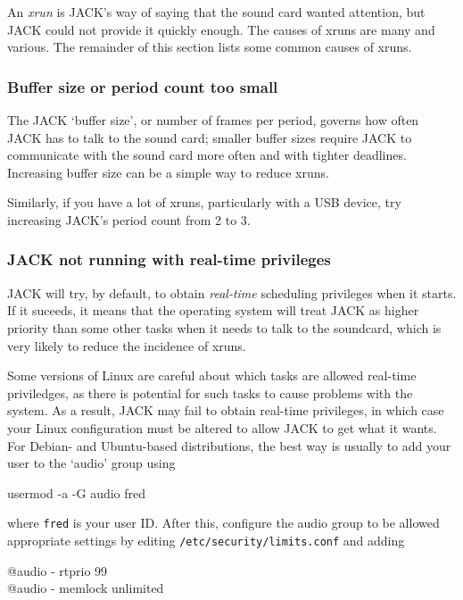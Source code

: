 \documentclass[10pt,a4paper]{book}
\begin{document}
{An \emph{xrun}  is JACK's way of saying that the sound
card wanted attention, but JACK could not provide it quickly enough.
The causes of xruns are many and various.  The remainder of this
section lists some common causes of xruns.


\subsubsection{Buffer size or period count too small}

The JACK `buffer size', or number of frames per period, governs how
often JACK has to talk to the sound card; smaller buffer sizes require
JACK to communicate with the sound card more often and with tighter
deadlines.  Increasing buffer size can be a simple way to reduce
xruns.

Similarly, if you have a lot of xruns, particularly with a USB device,
try increasing JACK's period count from 2 to 3.


\subsubsection{JACK not running with real-time privileges}

JACK will try, by default, to obtain \emph{real-time} scheduling
privileges when it starts.  If it suceeds, it means that the
operating system will treat JACK as higher priority than some other
tasks when it needs to talk to the soundcard, which is very likely to
reduce the incidence of xruns.

Some versions of Linux are careful about which tasks are allowed
real-time priviledges, as there is potential for such tasks to cause
problems with the system.  As a result, JACK may fail to obtain
real-time privileges, in which case your Linux configuration must be
altered to allow JACK to get what it wants.  For Debian- and
Ubuntu-based distributions, the best way is usually to add your user
to the `audio' group using

\begin{listing}
usermod -a -G audio fred
\end{listing}

where \texttt{fred} is your user ID\@.  After this, configure the audio
group to be allowed appropriate settings by editing
\texttt{/etc/security/limits.conf} and adding

\begin{listing}
@audio - rtprio 99\\
@audio - memlock unlimited
\end{listing}

}
\end{document}
